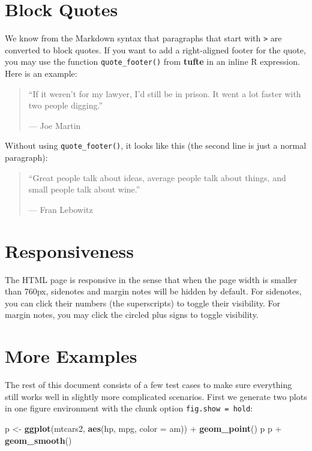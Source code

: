 \documentclass[]{tufte-handout}
\newenvironment{Shaded}{}{}
\newcommand{\KeywordTok}[1]{\textcolor[rgb]{0.00,0.44,0.13}{\textbf{#1}}}
\newcommand{\DataTypeTok}[1]{\textcolor[rgb]{0.56,0.13,0.00}{#1}}
\newcommand{\StringTok}[1]{\textcolor[rgb]{0.25,0.44,0.63}{#1}}
\newcommand{\OperatorTok}[1]{\textcolor[rgb]{0.40,0.40,0.40}{#1}}
\newcommand{\NormalTok}[1]{#1}
\begin{document}
\section{Block Quotes}\label{block-quotes}

We know from the Markdown syntax that paragraphs that start with
\texttt{\textgreater{}} are converted to block quotes. If you want to
add a right-aligned footer for the quote, you may use the function
\texttt{quote\_footer()} from \textbf{tufte} in an inline R expression.
Here is an example:

\begin{quote}
``If it weren't for my lawyer, I'd still be in prison. It went a lot
faster with two people digging.''

\hfill --- Joe Martin
\end{quote}

Without using \texttt{quote\_footer()}, it looks like this (the second
line is just a normal paragraph):

\begin{quote}
``Great people talk about ideas, average people talk about things, and
small people talk about wine.''

--- Fran Lebowitz
\end{quote}

\section{Responsiveness}\label{responsiveness}

The HTML page is responsive in the sense that when the page width is
smaller than 760px, sidenotes and margin notes will be hidden by
default. For sidenotes, you can click their numbers (the superscripts)
to toggle their visibility. For margin notes, you may click the circled
plus signs to toggle visibility.

\section{More Examples}\label{more-examples}

The rest of this document consists of a few test cases to make sure
everything still works well in slightly more complicated scenarios.
First we generate two plots in one figure environment with the chunk
option \texttt{fig.show\ =\ \textquotesingle{}hold\textquotesingle{}}:

\begin{Shaded}
\begin{Highlighting}[]
\NormalTok{p <-}\StringTok{ }\KeywordTok{ggplot}\NormalTok{(mtcars2, }\KeywordTok{aes}\NormalTok{(hp, mpg, }\DataTypeTok{color =}\NormalTok{ am)) }\OperatorTok{+}
\StringTok{  }\KeywordTok{geom_point}\NormalTok{()}
\NormalTok{p}
\NormalTok{p }\OperatorTok{+}\StringTok{ }\KeywordTok{geom_smooth}\NormalTok{()}
\end{Highlighting}
\end{Shaded}
\end{document}
